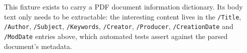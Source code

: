 \documentclass{article}
\begin{document}
This fixture exists to carry a PDF document information dictionary. Its body
text only needs to be extractable: the interesting content lives in the
\verb|/Title|, \verb|/Author|, \verb|/Subject|, \verb|/Keywords|,
\verb|/Creator|, \verb|/Producer|, \verb|/CreationDate| and \verb|/ModDate|
entries above, which automated tests assert against the parsed document's
metadata.
\end{document}
